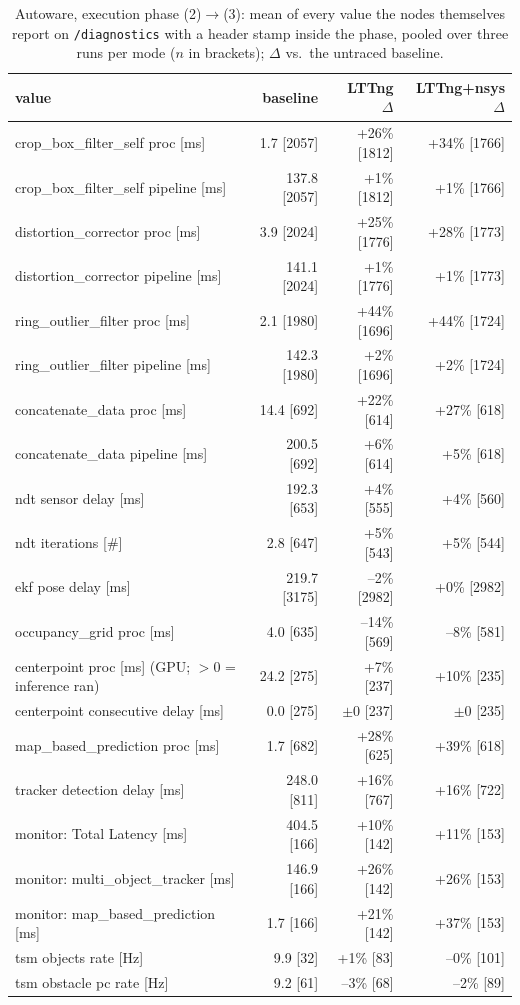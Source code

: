 \begin{table}[t]\centering\scriptsize
\caption{Autoware, execution phase (2)$\rightarrow$(3): mean of every value the nodes themselves report on \texttt{/diagnostics} with a header stamp inside the phase, pooled over three runs per mode ($n$ in brackets); $\Delta$ vs.\ the untraced baseline.}
\label{tab:aw-phase-execution}
\begin{tabular}{lrrr}
\toprule
value & baseline & LTTng $\Delta$ & LTTng+nsys $\Delta$ \\
\midrule
crop\_box\_filter\_self proc [ms] & 1.7 [2057] & +26\% [1812] & +34\% [1766] \\
crop\_box\_filter\_self pipeline [ms] & 137.8 [2057] & +1\% [1812] & +1\% [1766] \\
distortion\_corrector proc [ms] & 3.9 [2024] & +25\% [1776] & +28\% [1773] \\
distortion\_corrector pipeline [ms] & 141.1 [2024] & +1\% [1776] & +1\% [1773] \\
ring\_outlier\_filter proc [ms] & 2.1 [1980] & +44\% [1696] & +44\% [1724] \\
ring\_outlier\_filter pipeline [ms] & 142.3 [1980] & +2\% [1696] & +2\% [1724] \\
concatenate\_data proc [ms] & 14.4 [692] & +22\% [614] & +27\% [618] \\
concatenate\_data pipeline [ms] & 200.5 [692] & +6\% [614] & +5\% [618] \\
ndt sensor delay [ms] & 192.3 [653] & +4\% [555] & +4\% [560] \\
ndt iterations [\#] & 2.8 [647] & +5\% [543] & +5\% [544] \\
ekf pose delay [ms] & 219.7 [3175] & --2\% [2982] & +0\% [2982] \\
occupancy\_grid proc [ms] & 4.0 [635] & --14\% [569] & --8\% [581] \\
centerpoint proc [ms] (GPU; $>$0 = inference ran) & 24.2 [275] & +7\% [237] & +10\% [235] \\
centerpoint consecutive delay [ms] & 0.0 [275] & $\pm$0 [237] & $\pm$0 [235] \\
map\_based\_prediction proc [ms] & 1.7 [682] & +28\% [625] & +39\% [618] \\
tracker detection delay [ms] & 248.0 [811] & +16\% [767] & +16\% [722] \\
monitor: Total Latency [ms] & 404.5 [166] & +10\% [142] & +11\% [153] \\
monitor: multi\_object\_tracker [ms] & 146.9 [166] & +26\% [142] & +26\% [153] \\
monitor: map\_based\_prediction [ms] & 1.7 [166] & +21\% [142] & +37\% [153] \\
tsm objects rate [Hz] & 9.9 [32] & +1\% [83] & --0\% [101] \\
tsm obstacle pc rate [Hz] & 9.2 [61] & --3\% [68] & --2\% [89] \\
\bottomrule
\end{tabular}
\end{table}
